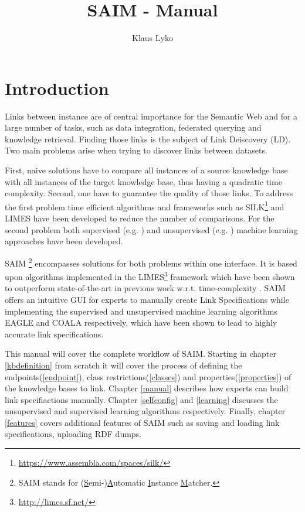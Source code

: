 \documentclass[oneside,a4paper,12pt]{memoir}
\begin{document}
\title{SAIM - Manual}
\author{Klaus Lyko}                                                  
\maketitle
\tableofcontents*
\chapter{Introduction}
Links between instance are of central importance for the Semantic Web and for a large number of tasks, such as data integration, federated querying and knowledge retrieval. Finding those links is the subject of Link Deiscovery (LD).
Two main problems arise when trying to discover links between datasets.

First, naive solutions have to compare all instances of a source knowledge base with all instances of the target knowledge base, thus having a quadratic time complexity. Second, one have to guarantee the quality of those links. 
To address the first problem time efficient algorithms and frameworks such as SILK\footnote{\url{https://www.assembla.com/spaces/silk/}} and LIMES\cite{NGAU11} have been developed to reduce the number of comparisons. For the second problem both supervised (e.g. \cite{NGLY12, NGO+13}) and unsupervised ({e.g. \cite{NIK+12}}) machine learning approaches have been developed.

SAIM \footnote{SAIM stands for (\uline{S}emi-)\uline{A}utomatic \uline{I}nstance \uline{M}atcher.}  encompasses solutions for both problems within one interface. It is based upon algorithms implemented in the LIMES\footnote{\url{http://limes.sf.net/}} framework which have been shown to outperform state-of-the-art in previous work w.r.t. time-complexity \cite{NGON12c}. SAIM offers an intuitive GUI for experts to manually create Link Specifications while implementing the supervised and unsupervised machine learning algorithms EAGLE \cite{NGLY12}	and COALA \cite{NGO+13} respectively, which have been shown to lead to highly accurate link specifications.

This manual will cover the complete workflow of SAIM. Starting in chapter \ref{kbdefinition} from scratch it will cover the process of defining the endpoints(\ref{endpoint}), class restrictions(\ref{classes}) and properties(\ref{properties}) of the knowledge bases to link. Chapter \ref{manual} describes how experts can build link specifiactions manually. Chapter \ref{selfconfig} and \ref{learning} discusses the unsupervised and supervised learning algorithms respectively. Finally, chapter \ref{features} covers additional features of SAIM such as saving and loading link specifications, uploading RDF dumps.
\end{document}
